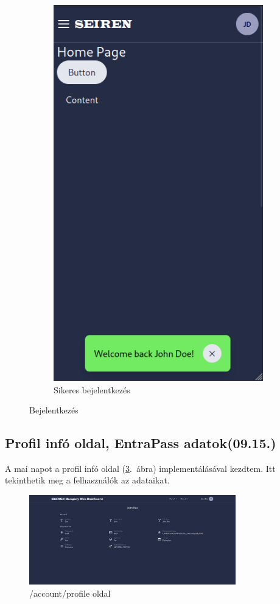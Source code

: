 \documentclass[a4paper]{article}
\begin{document}
\begin{figure}[ht]
    \hfill
    \begin{subfigure}[b]{0.45\textwidth}
        \centering
        \includegraphics[height=0.4\textheight]{images/login_successful.png}
        \caption{Sikeres bejelentkezés}
        \label{fig:login_successful}
    \end{subfigure}
    \caption{Bejelentkezés}
    \label{fig:login}
\end{figure}

\subsection{Profil infó oldal, EntraPass adatok(09.15.)}

A mai napot a profil infó oldal (\ref{fig:profile_info}.~ábra) implementálásával kezdtem. Itt tekinthetik meg a
felhasználók az adataikat.

\begin{figure}[ht]
  \centering
  \includegraphics[width = 0.8\textwidth]{images/profile_info.png}
  \caption{/account/profile oldal}
  \label{fig:profile_info}
\end{figure}
\end{document}
